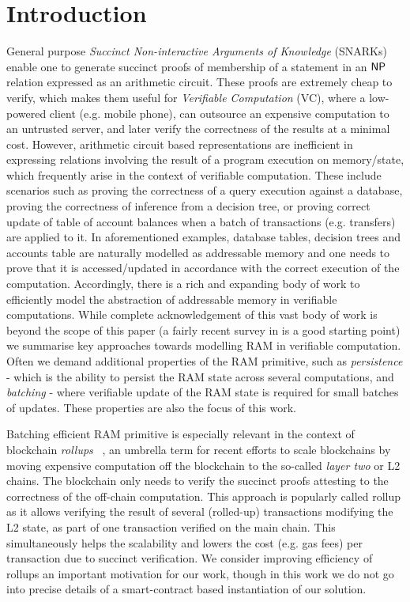 \documentclass[sigconf]{acmart}
\begin{document}
\section{Introduction}\label{sec:introduction}
General purpose {\em Succinct Non-interactive Arguments of Knowledge} (SNARKs) enable one to generate succinct
proofs of membership of a statement in an $\mathsf{NP}$ relation expressed as an arithmetic circuit. These proofs are
extremely cheap to verify, which makes them useful for {\em Verifiable Computation} (VC), where a low-powered
client (e.g. mobile phone), can outsource an expensive computation to an untrusted server, and later
verify the correctness of the results at a minimal cost.
However,
arithmetic circuit based representations are inefficient in expressing relations involving the result of
a program execution on memory/state, which frequently arise in the context of verifiable computation.
These include scenarios such as proving the correctness of a query execution against a database,
proving the correctness of inference
from a decision tree, or proving correct update of table of account balances when a batch of transactions (e.g. transfers)
are applied to it.
In aforementioned examples, database tables, decision trees and accounts table are naturally
modelled as addressable memory and one needs to prove that it is accessed/updated in accordance with the correct execution
of the computation. Accordingly, there is a rich and expanding body of work to efficiently model the abstraction of
addressable memory in verifiable computations. While complete acknowledgement of this vast body of work is beyond
the scope of this paper (a fairly recent survey in \cite{WB15} is a good starting point) we summarise key approaches towards
modelling RAM in verifiable computation. Often we demand additional properties of the RAM primitive, such as
{\em persistence} - which is the ability to persist the RAM state across several computations, and {\em batching} -
where verifiable update of the RAM state is required for small batches of updates. These properties are also
the focus of this work.

Batching efficient RAM primitive is especially relevant in the context of blockchain {\em rollups} ~\cite{rollup},
an umbrella term for recent efforts to scale blockchains
by moving expensive computation off the blockchain to the so-called {\em layer two} or L2 chains. The blockchain
only needs to verify the succinct proofs attesting to the correctness of the off-chain computation. This approach
is popularly called rollup as it allows verifying the result of several (rolled-up) transactions
modifying the L2 state, as part of one transaction verified on the main chain.
This simultaneously helps the scalability and lowers the cost (e.g. gas fees)
per transaction due to succinct verification.
We consider improving efficiency of rollups an important
motivation for our work, though in this work we do not go into precise details of a smart-contract based
instantiation of our solution.
\end{document}
